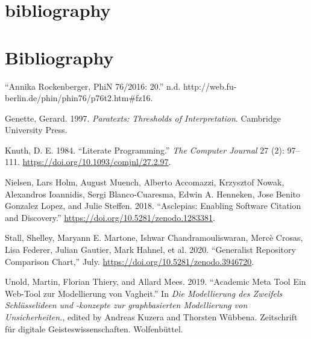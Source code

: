 \documentclass[
  english,
  paper=a4,
  oneside,captions=tableheading
]{scrbook}
\newlength{\cslhangindent}
\newenvironment{cslreferences}%
  {\setlength{\parindent}{0pt}%
  \everypar{\setlength{\hangindent}{\cslhangindent}}\ignorespaces}%
  {\par}
\begin{document}
\hypertarget{bibliography}{%
\section{bibliography}\label{bibliography}}

\hypertarget{bibliography-1}{%
\section*{Bibliography}\label{bibliography-1}}

\hypertarget{refs}{}
\begin{cslreferences}
\leavevmode\hypertarget{ref-zotero-40395}{}%
``Annika Rockenberger, PhiN 76/2016: 20.'' n.d.
http://web.fu-berlin.de/phin/phin76/p76t2.htm\#fz16.

\leavevmode\hypertarget{ref-genette1997}{}%
Genette, Gerard. 1997. \emph{Paratexts: Thresholds of Interpretation}.
Cambridge University Press.

\leavevmode\hypertarget{ref-knuth1984a}{}%
Knuth, D. E. 1984. ``Literate Programming.'' \emph{The Computer Journal}
27 (2): 97--111. \url{https://doi.org/10.1093/comjnl/27.2.97}.

\leavevmode\hypertarget{ref-nielsen2018}{}%
Nielsen, Lars Holm, August Muench, Alberto Accomazzi, Krzysztof Nowak,
Alexandros Ioannidis, Sergi Blanco-Cuaresma, Edwin A. Henneken, Jose
Benito Gonzalez Lopez, and Julie Steffen. 2018. ``Asclepias: Enabling
Software Citation and Discovery.''
\url{https://doi.org/10.5281/zenodo.1283381}.

\leavevmode\hypertarget{ref-stall2020a}{}%
Stall, Shelley, Maryann E. Martone, Ishwar Chandramouliswaran, Mercè
Crosas, Lisa Federer, Julian Gautier, Mark Hahnel, et al. 2020.
``Generalist Repository Comparison Chart,'' July.
\url{https://doi.org/10.5281/zenodo.3946720}.

\leavevmode\hypertarget{ref-unold2019}{}%
Unold, Martin, Florian Thiery, and Allard Mees. 2019. ``Academic Meta
Tool Ein Web-Tool zur Modellierung von Vagheit.'' In \emph{Die
Modellierung des Zweifels Schlüsselideen und -konzepte zur
graphbasierten Modellierung von Unsicherheiten.}, edited by Andreas
Kuzera and Thorsten Wübbena. Zeitschrift für digitale
Geisteswissenschaften. Wolfenbüttel.
\end{cslreferences}

\backmatter
\end{document}
